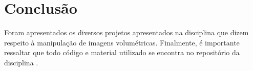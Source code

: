 \section{Conclusão} \label{sec:int}
    Foram apresentados os diversos projetos apresentados na disciplina que dizem respeito à manipulação de imagens volumétricas. Finalmente, é importante ressaltar que todo código e material utilizado se encontra no repositório da disciplina \cite{REPO}.

 



